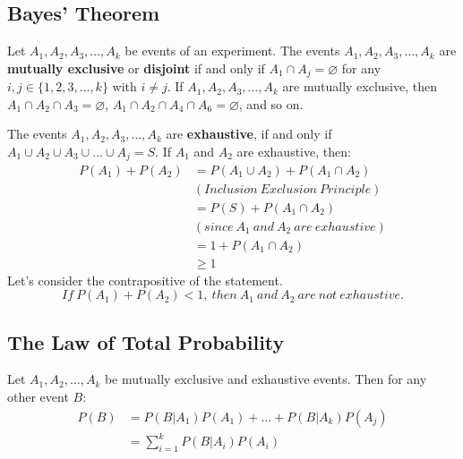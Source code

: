 \documentclass{math}
\begin{document}
\subsection*{Bayes' Theorem}
Let \( A_{1}, A_{2}, A_{3}, \dots, A_{k} \) be events of an experiment.
The events \( A_{1}, A_{2}, A_{3}, \dots, A_{k} \) are \textbf{mutually
exclusive} or \textbf{disjoint} if and only if \( A_{1} \cap A_{j} =
\varnothing \) for any \( i, j \in \{1, 2, 3, \dots, k \} \) with \( i \neq j \).
If \( A_{1}, A_{2}, A_{3}, \dots, A_{k} \) are mutually exclusive, then
\( A_{1} \cap A_{2} \cap A_{3} = \varnothing \), \( A_{1} \cap A_{2} \cap A_{4}
\cap A_{6} = \varnothing \), and so on. \par
The events \( A_{1}, A_{2}, A_{3}, \dots, A_{k} \) are \textbf{exhaustive},
if and only if \( A_{1} \cup A_{2} \cup A_{3} \cup \dots \cup A_{j} = S \).
If \( A_{1} \) and \( A_{2} \) are exhaustive, then:
\begin{align*}
  P(A_{1})+P(A_{2}) &= P(A_{1} \cup A_{2})+P(A_{1} \cap A_{2}) \\
  &(Inclusion\ Exclusion\ Principle) \\
  &= P(S)+P(A_{1} \cap A_{2}) \\
  &(since\ A_{1}\ and\ A_{2}\ are\ exhaustive) \\
  &= 1+P(A_{1} \cap A_{2}) \\
  &\geq 1
\end{align*}
Let's consider the contrapositive of the statement.
\[ If\ P(A_{1})+P(A_{2}) < 1,\ then\ A_{1}\ and\ A_{2}\ are\ not\ exhaustive. \]

\subsection*{The Law of Total Probability}
Let \( A_{1}, A_{2}, \dots, A_{k} \) be mutually exclusive and exhaustive
events. Then for any other event \( B \):
\begin{align*}
  P(B) &= P(B|A_{1})P(A_{1})+\dots+P(B|A_{k})P(A_{j}) \\
  &= \sum_{i=1}^{k}P(B|A_{i})P(A_{i})
\end{align*}
\end{document}
